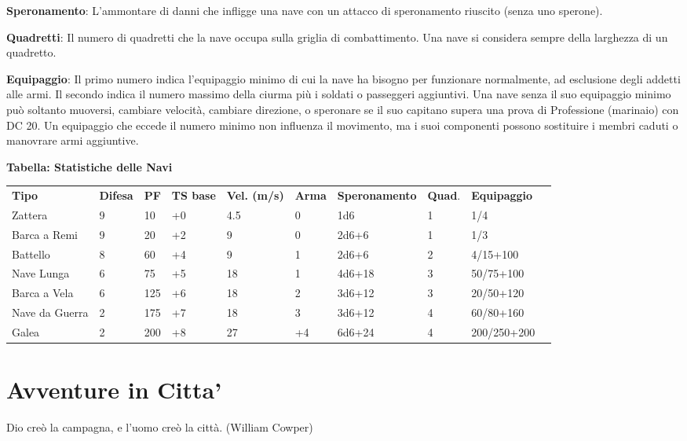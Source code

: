 \documentclass[a4paper,11pt,twoside,openany]{book}
\begin{document}
\textbf{Speronamento}: L'ammontare di danni che infligge una nave con un attacco di speronamento riuscito (senza uno sperone).

\textbf{Quadretti}: Il numero di quadretti che la nave occupa sulla griglia di combattimento. Una nave si considera sempre della larghezza di un quadretto.

\textbf{Equipaggio}: Il primo numero indica l'equipaggio minimo di cui la nave ha bisogno per funzionare normalmente, ad esclusione degli addetti alle armi. Il secondo indica il numero massimo della ciurma più i soldati o passeggeri aggiuntivi. Una nave senza il suo equipaggio minimo può soltanto muoversi, cambiare velocità, cambiare direzione, o speronare se il suo capitano supera una prova di Professione (marinaio) con DC 20.
Un equipaggio che eccede il numero minimo non influenza il movimento, ma i suoi componenti possono sostituire i membri caduti o manovrare armi aggiuntive.

\bigskip

\textbf{Tabella: Statistiche delle Navi}

\medskip

\begin{tabularx}{\textwidth}{lXlllllXll}
	\toprule
	\textbf{Tipo}  & \textbf{Difesa} & \textbf{PF} & \textbf{TS base} & \textbf{Vel. (m/s)} & \textbf{Arma} & \textbf{Speronamento} & \textbf{Quad}. & \textbf{Equipaggio}\tabularnewline
	Zattera   & 9     & 10& +0& 4.5  & 0   & 1d6    & 1    & 1/4\tabularnewline
	Barca a Remi   & 9& 20& +2& 9    & 0   & 2d6+6  & 1    & 1/3\tabularnewline
	Battello  & 8& 60& +4& 9    & 1   & 2d6+6  & 2    & 4/15+100\tabularnewline
	Nave Lunga& 6& 75& +5& 18   & 1   & 4d6+18 & 3    & 50/75+100\tabularnewline
	Barca a Vela   & 6& 125    & +6& 18   & 2   & 3d6+12 & 3    & 20/50+120\tabularnewline
	Nave da Guerra & 2& 175    & +7& 18   & 3   & 3d6+12 & 4    & 60/80+160\tabularnewline
	Galea& 2& 200    & +8& 27   & +4  & 6d6+24 & 4    & 200/250+200\tabularnewline
\end{tabularx}

\pagebreak

\section{Avventure in Citta'}

\label{avventure-in-citta}
\begin{tcolorbox}[enhanced,arc=5pt,boxrule=0.3pt]{Dio creò la campagna, e l'uomo creò la città. (William Cowper)}\end{tcolorbox}\medskip
\end{document}
